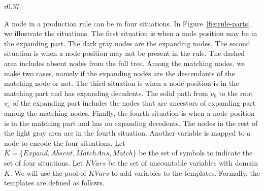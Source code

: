 \begin{wrapfigure}{r}{0.37\textwidth}
    \vspace{-6mm}
        \center
  \caption{Parts of production rules in the rule templates.}
  \label{fig:rule-parts}
  \vspace{-8mm}
\end{wrapfigure}
A node in a production rule can be in four situations.
In Figure~\ref{fig:rule-parts}, we illustrate the situations.
The first situation is when a node position may be in the expanding part.
The dark gray nodes are the expanding nodes.
The second situation is when a node position may not be present in the rule.
The dashed area includes absent nodes
from the full tree.
Among the matching nodes, we make two cases, namely if the expanding
nodes are the descendants of the matching node or not. 
The third situation is when a node position is in the matching part
and has expanding decadents.
The solid path from $v_0$ to the root $v_e$ of the expanding part includes
the nodes that are ancestors of expanding part among the matching nodes.
Finally, the fourth situation is when a node position is in the matching part and
has no expanding decedents.
The nodes in the rest of the light gray area are in the fourth situation.
Another variable is mapped to a node to encode the four situations.
Let $K =\{Expand,Absent,MatchAns,Match\}$ be the set of symbols to
indicate the set of four situations.
Let $KVars$ be the set of uncountable variables with domain $K$. 
We will use the pool of $KVars$ to add variables to the templates.
Formally, the templates are defined as follows.



